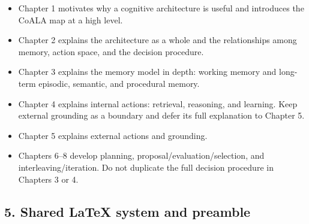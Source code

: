 \begin{itemize}
\tightlist
\item
  Chapter 1 motivates why a cognitive architecture is useful and
  introduces the CoALA map at a high level.
\item
  Chapter 2 explains the architecture as a whole and the relationships
  among memory, action space, and the decision procedure.
\item
  Chapter 3 explains the memory model in depth: working memory and
  long-term episodic, semantic, and procedural memory.
\item
  Chapter 4 explains internal actions: retrieval, reasoning, and
  learning. Keep external grounding as a boundary and defer its full
  explanation to Chapter 5.
\item
  Chapter 5 explains external actions and grounding.
\item
  Chapters 6--8 develop planning, proposal/evaluation/selection, and
  interleaving/iteration. Do not duplicate the full decision procedure
  in Chapters 3 or 4.
\end{itemize}

\subsection{5. Shared LaTeX system and
preamble}\label{5-shared-latex-system-and-preamble}

